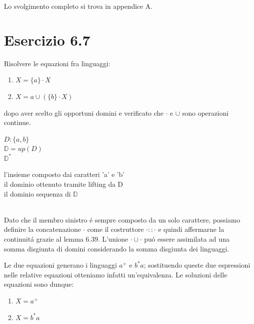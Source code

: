 		Lo svolgimento completo si trova in appendice A.
		
		\newpage
	
	\section{Esercizio 6.7}
		\qquad Risolvere le equazioni fra linguaggi:
		\begin{enumerate}
		  \item $X = \{a\} \cdot X$
		  \item $X = {a} \cup (\{b\} \cdot X)$
		\end{enumerate}
		dopo aver scelto gli opportuni domini e verificato che $\cdot$ e $\cup$ sono
		operazioni continue.
		
		\sectionline
		
		\begin{minipage}{0.2\linewidth}
			\begin{flushleft}
				$D:\{a,b\}$\\
				$\mathbb{D} = up(D)$\\
				$\mathbb{D}^*$
			\end{flushleft}
		\end{minipage}
		\hfill
		\begin{minipage}{0.7\linewidth}
			\begin{flushright}
				l'insieme composto dai caratteri 'a' e 'b'\\
				il dominio ottenuto tramite lifting da D\\
				il dominio sequenza di $\mathbb{D}$
			\end{flushright}
		\end{minipage}\\
		
		Dato che il membro sinistro \'e sempre composto da un solo carattere,
		possiamo definire la concatenazione $\cdot$ come il costruttore $\cdot ::
		\cdot$ e quindi affermarne la continuit\'a grazie al lemma $6.39$. L'unione
		$\cdot\cup\cdot$ pu\'o essere assimilata ad una somma disgiunta di domini
		considerando la somma disgiunta dei linguaggi.
		
		Le due equazioni generano i linguaggi $a^+$ e $b^*a$; sostituendo queste due
		espressioni nelle relative equazioni otteniamo infatti un'equivalenza. Le
		soluzioni delle equazioni sono dunque:
		
		\begin{enumerate}
		  \item $X = a^+$
		  \item $X = b^*a$
		\end{enumerate}
		
